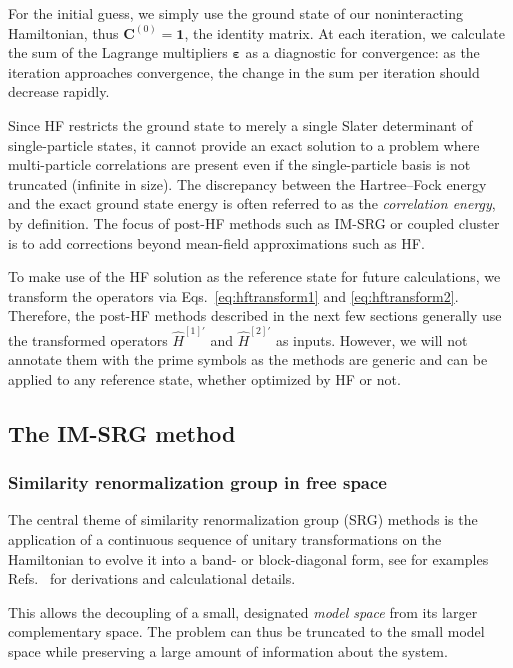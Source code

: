 For the initial guess, we simply use the ground state of our
noninteracting Hamiltonian, thus $\bm{C}^{(0)} = \bm{1}$, the identity
matrix.  At each iteration, we calculate the sum of the Lagrange
multipliers $\bm{\varepsilon}$ as a diagnostic for convergence: as the
iteration approaches convergence, the change in the sum per iteration
should decrease rapidly.

Since HF restricts the ground state to merely a single Slater
determinant of single-particle states, it cannot provide an exact
solution to a problem where multi-particle correlations are present
even if the single-particle basis is not truncated (infinite in size).
The discrepancy between the Hartree--Fock energy and the exact ground
state energy is often referred to as the \textit{correlation energy},
by definition.  The focus of post-HF methods such as IM-SRG or coupled
cluster is to add corrections beyond mean-field approximations such as
HF.

To make use of the HF solution as the reference state for future
calculations, we transform the operators via Eqs.~\eqref{eq:hftransform1}
and \eqref{eq:hftransform2}.  Therefore, the post-HF methods described
in the next few sections generally use the transformed operators
$\hat{H}^{[1] \prime}$ and $\hat{H}^{[2] \prime}$ as inputs.  However,
we will not annotate them with the prime symbols as the methods are
generic and can be applied to any reference state, whether optimized
by HF or not.

\subsection{The IM-SRG method}
\label{subsec:imsrgmethod}

\subsubsection{Similarity renormalization group in free space}
\label{subsubsec:srgmethods}

The central theme of similarity renormalization group (SRG) methods is
the application of a continuous sequence of unitary transformations on
the Hamiltonian to evolve it into a band- or block-diagonal form, see
for examples Refs.~\cite{kehreinflow2006,heikophysrep2016,lnp936} for
derivations and calculational details.  

This allows the decoupling of
a small, designated \textit{model space} from its larger complementary
space.  The problem can thus be truncated to the small model space
while preserving a large amount of information about the system.

